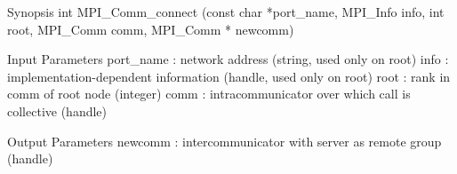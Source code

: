 Synopsis
int MPI_Comm_connect
   (const char *port_name, MPI_Info info, int root,
    MPI_Comm comm, MPI_Comm * newcomm)

Input Parameters
port_name : network address (string, used only on root)
info : implementation-dependent information (handle, used only on root)
root : rank in comm of root node (integer)
comm : intracommunicator over which call is collective (handle)

Output Parameters
newcomm : intercommunicator with server as remote group (handle)
